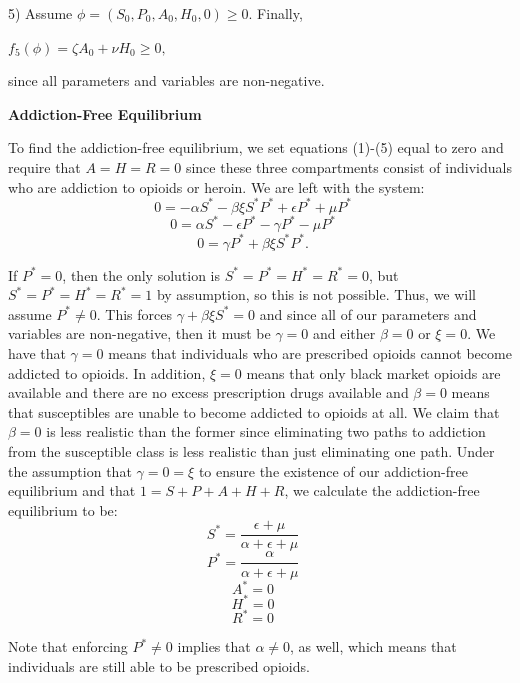 \documentclass[12pt]{article}
\begin{document}
5)  Assume $\phi = (S_0, P_0, A_0, H_0, 0) \geq 0.$ Finally,
\begin{center}
$f_5(\phi)=\zeta A_0 +\nu H_0 \geq 0,$
\end{center}
since all parameters and variables are non-negative. 

 
\textbf{Addiction-Free Equilibrium} 

To find the addiction-free equilibrium, we set equations (1)-(5) equal to zero and require that $A=H=R=0$ since these three compartments consist of individuals who are addiction to opioids or heroin. We are left with the system: \\
\[0=-\alpha S^* -\beta \xi S^* P^* + \epsilon P^* +\mu P^* \quad\]
\[0=\alpha S^* - \epsilon P^* -\gamma P^* - \mu P^* \quad\]
\[0=\gamma P^* + \beta \xi S^* P^*.   \quad\]



If $P^*=0$, then the only solution is $S^*=P^*=H^*=R^*=0$, but $S^*=P^*=H^*=R^*=1$ by assumption, so this is not possible. Thus, we will assume $P^* \neq 0. $ This forces $\gamma + \beta \xi S^* =0$ and since all of our parameters and variables are non-negative, then it must be $\gamma=0$ and either $\beta=0$ or $\xi=0$. We have that $\gamma=0$ means that individuals who are prescribed opioids cannot become addicted to opioids. In addition, $\xi=0$ means that only black market opioids are available and there are no excess prescription drugs available and  $\beta=0$ means that susceptibles are unable to become addicted to opioids at all. We claim that $\beta=0$ is less realistic than the former since eliminating two paths to addiction from the susceptible class is less realistic than just eliminating one path. Under the assumption that $\gamma=0=\xi$ to ensure the existence of our addiction-free equilibrium and that $1=S+P+A+H+R$, we calculate the addiction-free equilibrium to be: \\

\[S^*=\frac{\epsilon + \mu}{\alpha + \epsilon +\mu}\quad\]
\[P^*=\frac{\alpha}{\alpha + \epsilon +\mu}\quad\]
\[A^*=0\quad\]
\[H^*=0\quad\]
\[R^*=0\quad\] 

Note that enforcing $P^* \neq 0$ implies that $\alpha \neq 0$, as well, which means that individuals are still able to be prescribed opioids. 
\end{document}

